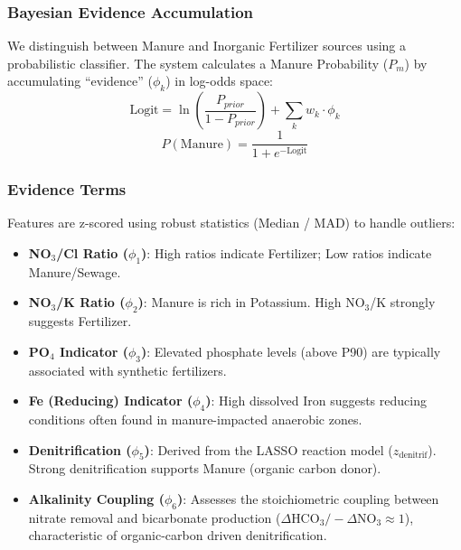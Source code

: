 \documentclass[12pt,a4paper]{article}
\theoremstyle{plain}
\theoremstyle{definition}
\theoremstyle{remark}
\begin{document}
\subsubsection{Bayesian Evidence Accumulation}
We distinguish between Manure and Inorganic Fertilizer sources using a probabilistic classifier. The system calculates a Manure Probability ($P_m$) by accumulating ``evidence'' ($\phi_k$) in log-odds space:
\begin{equation}
	\text{Logit} = \ln\left(\frac{P_{prior}}{1-P_{prior}}\right) + \sum_{k} w_k \cdot \phi_k
\end{equation}
\begin{equation}
	P(\text{Manure}) = \frac{1}{1 + e^{-\text{Logit}}}
\end{equation}

\subsubsection{Evidence Terms}
Features are z-scored using robust statistics (Median / MAD) to handle outliers:
\begin{itemize}
	\item \textbf{NO$_3$/Cl Ratio ($\phi_1$)}: High ratios indicate Fertilizer; Low ratios indicate Manure/Sewage.
	\item \textbf{NO$_3$/K Ratio ($\phi_2$)}: Manure is rich in Potassium. High NO$_3$/K strongly suggests Fertilizer.
	\item \textbf{PO$_4$ Indicator ($\phi_3$)}: Elevated phosphate levels (above P90) are typically associated with synthetic fertilizers.
	\item \textbf{Fe (Reducing) Indicator ($\phi_4$)}: High dissolved Iron suggests reducing conditions often found in manure-impacted anaerobic zones.
	\item \textbf{Denitrification ($\phi_5$)}: Derived from the LASSO reaction model ($z_{\text{denitrif}}$). Strong denitrification supports Manure (organic carbon donor).
	\item \textbf{Alkalinity Coupling ($\phi_6$)}: Assesses the stoichiometric coupling between nitrate removal and bicarbonate production ($\Delta \text{HCO}_3 / -\Delta \text{NO}_3 \approx 1$), characteristic of organic-carbon driven denitrification.
\end{itemize}
\end{document}
